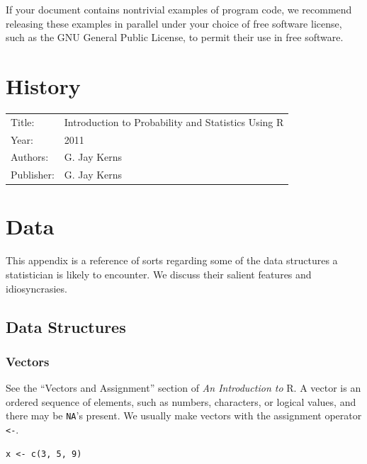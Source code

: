 \documentclass[captions=tableheading]{scrbook}
\begin{document}
If your document contains nontrivial examples of program code, we recommend releasing these examples in parallel under your choice of free software license, such as the GNU General Public License, to permit their use in free software. 
\chapter{History}
\label{sec-19}

\label{cha:History}


\begin{center}
\begin{tabular}{ll}
 Title:      &  Introduction to Probability and Statistics Using \textsf{R}  \\
 Year:       &  2011                                                         \\
 Authors:    &  G. Jay Kerns                                                 \\
 Publisher:  &  G. Jay Kerns                                                 \\
\end{tabular}
\end{center}



\vfill{}
\chapter{Data}
\label{sec-20}

\label{cha:data}

This appendix is a reference of sorts regarding some of the data structures a statistician is likely to encounter. We discuss their salient features and idiosyncrasies.
\section{Data Structures \label{sec:Data-Structures}}
\label{sec-20-1}
\subsection{Vectors}
\label{sec-20-1-1}


See the ``Vectors and Assignment'' section of \emph{An Introduction to} \textsf{R}. A vector is an ordered sequence of elements, such as numbers, characters, or logical values, and there may be \texttt{NA}'s present. We usually make vectors with the assignment operator \texttt{<-}.


\begin{verbatim}
x <- c(3, 5, 9)
\end{verbatim}
\end{document}
